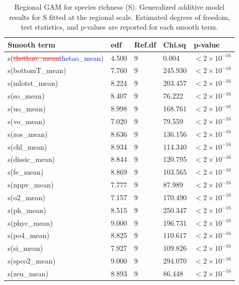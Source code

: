 \documentclass[a4paper,fleqn]{cas-sc}
\DeclareRobustCommand{\deleted}[1]{\textcolor{red}{\sout{#1}}}
\DeclareRobustCommand{\added}[1]{\textcolor{blue}{#1}}
\begin{document}
\begin{table}[width=.9\linewidth,cols=5,pos=!htbp]
\caption{Regional GAM for species richness (S). Generalized additive model results for S fitted at the regional scale. Estimated degrees of freedom, test statistics, and p-values are reported for each smooth term.}
\small
\begin{tabular*}{\tblwidth}{@{} LLLLL @{}}
\toprule
\textbf{Smooth term} & \textbf{edf} & \textbf{Ref.df} & \textbf{Chi.sq} & \textbf{p-value} \\
\midrule
s(\deleted{thethao\_mean}\added{thetao\_mean})      & 4.500 & 9 &   0.004 & $<2 \times 10^{-16}$ \\
s(bottomT\_mean) & 7.760 & 9 & 245.930 & $<2 \times 10^{-16}$ \\
s(mlotst\_mean)   & 8.224 & 9 & 203.457 & $<2 \times 10^{-16}$ \\
s(so\_mean)       & 8.407 & 9 &  76.222 & $<2 \times 10^{-16}$ \\
s(uo\_mean)       & 8.998 & 9 & 168.761 & $<2 \times 10^{-16}$ \\
s(vo\_mean)       & 7.020 & 9 &  79.559 & $<2 \times 10^{-16}$ \\
s(zos\_mean)      & 8.636 & 9 & 136.156 & $<2 \times 10^{-16}$ \\
s(chl\_mean)      & 8.934 & 9 & 114.340 & $<2 \times 10^{-16}$ \\
s(dissic\_mean)   & 8.844 & 9 & 120.795 & $<2 \times 10^{-16}$ \\
s(fe\_mean)       & 8.869 & 9 & 103.565 & $<2 \times 10^{-16}$ \\
s(nppv\_mean)     & 7.777 & 9 &  87.989 & $<2 \times 10^{-16}$ \\
s(o2\_mean)       & 7.157 & 9 & 170.490 & $<2 \times 10^{-16}$ \\
s(ph\_mean)       & 8.515 & 9 & 250.347 & $<2 \times 10^{-16}$ \\
s(phyc\_mean)     & 9.000 & 9 & 196.731 & $<2 \times 10^{-16}$ \\
s(po4\_mean)      & 8.825 & 9 & 110.617 & $<2 \times 10^{-16}$ \\
s(si\_mean)       & 7.927 & 9 & 109.826 & $<2 \times 10^{-16}$ \\
s(spco2\_mean)    & 9.000 & 9 & 294.070 & $<2 \times 10^{-16}$ \\
s(zeu\_mean)      & 8.893 & 9 &  86.448 & $<2 \times 10^{-16}$ \\
\bottomrule
\end{tabular*}
\label{tab:18}
\end{table}
\end{document}

